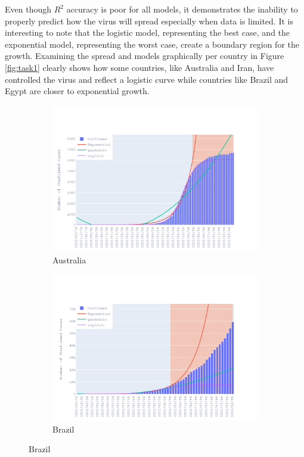 \documentclass{homework}
\begin{document}
Even though $R^2$ accuracy is poor for all models, it demonstrates the inability to properly predict how the virus will spread especially when data is limited. It is interesting to note that the logistic model, representing the best case, and the exponential model, representing the worst case, create a boundary region for the growth. Examining the spread and models graphically per country in Figure \ref{fig:task1} clearly shows how some countries, like Australia and Iran, have controlled the virus and reflect a logistic curve while countries like Brazil and Egypt are closer to exponential growth.

\begin{figure}[H]
  \centering
  \begin{subfigure}{0.45\linewidth}
    \includegraphics[width=\linewidth]{task1/Australia.png}
    \caption{Australia}
  \end{subfigure}
  \hfil
  \begin{subfigure}{0.45\linewidth}
    \includegraphics[width=\linewidth]{task1/Brazil.png}
    \caption{Brazil}
  \end{subfigure}


\end{figure}
\end{document}
